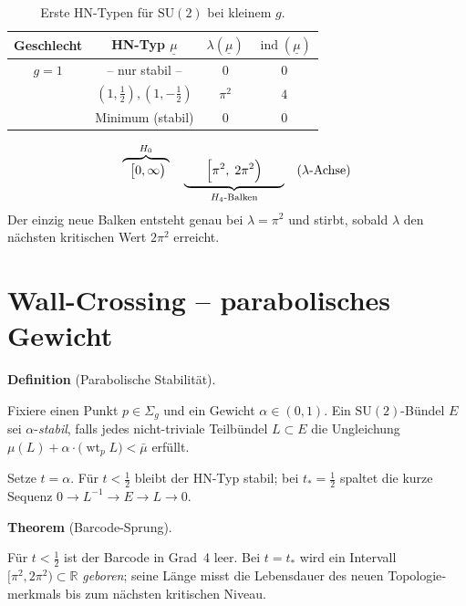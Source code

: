 \documentclass[10pt, letterpaper]{article}
\newcommand{\CustomHeading}[3]{%
  \par\medskip\noindent%
  \textbf{#1 #2} \textnormal{(#3)}.\enskip%
}
\newenvironment{DEF}[2]{\CustomHeading{Definition}{#1}{#2}}{}
\newenvironment{THEO}[2]{\CustomHeading{Theorem}{#1}{#2}}{}
\begin{document}

\begin{table}[h]
  \centering\footnotesize
  \begin{tabular}{@{}cccc@{}}
    \toprule
    Geschlecht & HN-Typ \(\underline\mu\)
               & \(\lambda(\underline\mu)\)
               & \(\operatorname{ind}(\underline\mu)\) \\
    \midrule
    \(g=1\) & – nur stabil – & \(0\) & \(0\) \\
    \addlinespace
    \multirow{2}{*}{\(g=2\)}
      & \((1,\tfrac12),(1,-\tfrac12)\)
      & \(\displaystyle\pi^2\)
      & \(4\) \\
      & Minimum (stabil)
      & \(0\)
      & \(0\)\\
    \bottomrule
  \end{tabular}
  \caption{Erste HN-Typen für \(\mathrm{SU}(2)\) bei kleinem \(g\).}
  \label{tab:HN_SU2}
\end{table}


\[
  \overbrace{\;\;\bigl[0,\infty\bigr)\;}^{H_0}
  \quad
  \underbrace{\phantom{xxx}
  \Bigl[\pi^2,\;2\pi^2\Bigr)\phantom{xxx}}_{H_4\text{-Balken}}
  \hspace*{1em}
  (\lambda\text{-Achse})
\]
Der einzig neue Balken entsteht genau bei \(\lambda=\pi^2\) und stirbt,
sobald \(\lambda\) den nächsten kritischen Wert \(2\pi^2\) erreicht.

\section{Wall-Crossing – parabolisches Gewicht}

\begin{DEF}{}{Parabolische Stabilität}
  Fixiere einen Punkt \(p\in\Sigma_g\) und ein Gewicht
  \(\alpha\in(0,1)\).  
  Ein \(\mathrm{SU}(2)\)-Bündel \(E\) sei \(\alpha\)-\emph{stabil},
  falls jedes nicht-triviale Teilbündel \(L\subset E\) die
  Ungleichung
  \(
    \mu(L)+\alpha\cdot\bigl(\operatorname{wt}_p L\bigr)<\bar\mu
  \)
  erfüllt.
\end{DEF}

Setze \(t=\alpha\).  
Für \(t<\tfrac12\) bleibt der HN-Typ stabil; bei
\(t_\ast=\tfrac12\) spaltet die kurze Sequenz
\(0\to L^{-1}\to E\to L\to0\).
  
\begin{THEO}{}{Barcode-Sprung}
  Für \(t<\tfrac12\) ist der Barcode in Grad~4 leer.
  Bei \(t=t_\ast\) wird ein Intervall
  \([\pi^2,2\pi^2)\subset\mathbb R\) \emph{geboren};
  seine Länge misst die Lebensdauer des neuen
  Topologie­merkmals bis zum nächsten kritischen Niveau.
\end{THEO}
\end{document}

